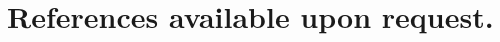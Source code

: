 \documentclass[letterpaper]{deedy-resume} %
\begin{document}
\begin{minipage}[t]{0.99\textwidth}
\sectionspace %

\section{References available upon request.}


\end{minipage} %

\end{document}
